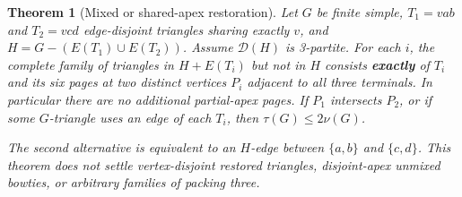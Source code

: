 \documentclass[11pt]{article}
\newtheorem{theorem}{Theorem}[section]
\theoremstyle{definition}\newtheorem{definition}[theorem]{Definition}
\theoremstyle{remark}\newtheorem{remark}[theorem]{Remark}
\begin{document}
\begin{theorem}[Mixed or shared-apex restoration]\label{thm:bowtie}
Let \(G\) be finite simple, \(T_1=vab\) and \(T_2=vcd\) edge-disjoint triangles sharing exactly \(v\), and \(H=G-(E(T_1) \cup E(T_2))\). Assume \(\mathcal D(H)\) is 3-partite. For each \(i\), the complete family of triangles in \(H+E(T_i)\) but not in \(H\) consists \textbf{exactly} of \(T_i\) and its six pages at two distinct vertices \(P_i\) adjacent to all three terminals. In particular there are no additional partial-apex pages. If \(P_1\) intersects \(P_2\), or if some \(G\)-triangle uses an edge of each \(T_i\), then \(\tau(G)\le 2\nu(G)\).

The second alternative is equivalent to an \(H\)-edge between \(\{a,b\}\) and \(\{c,d\}\). This theorem does not settle vertex-disjoint restored triangles, disjoint-apex unmixed bowties, or arbitrary families of packing three.
\end{theorem}
\end{document}
